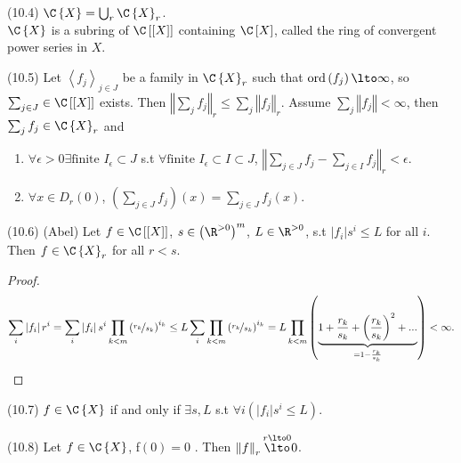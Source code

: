 \begin{defn*}
(10.4) $\C\left\{ X\right\} =\bigcup_{r}\C\left\{ X\right\} _{r}$.\\
$\C\left\{ X\right\} $ is a subring of $\C\left[\left[X\right]\right]$
containing $\C\left[X\right]$, called the ring of convergent power
series in $X$.\end{defn*}
\begin{xca*}
(10.5) Let $\left\langle f_{j}\right\rangle _{j\in J}$ be a family
in $\C\left\{ X\right\} _{r}$ such that $\mathrm{ord}\left(f_{j}\right)\lto\infty$,
so $\sum_{j\in J}\in\C\left[\left[X\right]\right]$ exists. Then $\left\Vert \sum_{j}f_{j}\right\Vert _{r}\leq\sum_{j}\left\Vert f_{j}\right\Vert _{r}$.
Assume $\sum_{j}\left\Vert f_{j}\right\Vert <\infty$, then $\sum_{j}f_{j}\in\C\left\{ X\right\} _{r}$
and\end{xca*}
\begin{enumerate}
\item $\forall\epsilon>0\exists\textrm{finite }I_{\epsilon}\subset J$ s.t
$\forall\textrm{finite }I_{\epsilon}\subset I\subset J$, $\left\Vert \sum_{j\in J}f_{j}-\sum_{j\in I}f_{j}\right\Vert _{r}<\epsilon$.
\item $\forall x\in D_{r}\left(0\right)$, $\left(\sum_{j\in J}f_{j}\right)\left(x\right)=\sum_{j\in J}f_{j}\left(x\right)$.\end{enumerate}
\begin{lem*}
(10.6) (Abel) Let $f\in\C\left[\left[X\right]\right]$, $s\in\left(\R^{>0}\right)^{m}$,
$L\in\R^{>0}$, s.t $\left|f_{i}\right|s^{i}\leq L$ for all $i$.\\
Then $f\in\C\left\{ X\right\} _{r}$ for all $r<s$.\end{lem*}
\begin{proof}
\[
\sum_{i}\left|f_{i}\right|r^{i}=\sum_{i}\left|f_{i}\right|s^{i}\prod_{k<m}\left(\nicefrac{r_{k}}{s_{k}}\right)^{i_{k}}\leq L\sum_{i}\prod_{k<m}\left(\nicefrac{r_{k}}{s_{k}}\right)^{i_{k}}=L\prod_{k<m}\left(\underbrace{1+\frac{r_{k}}{s_{k}}+\left(\frac{r_{k}}{s_{k}}\right)^{2}+...}_{=1-\frac{r_{k}}{s_{k}}}\right)<\infty.
\]
 \end{proof}
\begin{cor*}
(10.7) $f\in\C\left\{ X\right\} $ if and only if $\exists s,L$ s.t
$\forall i\left(\left|f_{i}\right|s^{i}\leq L\right)$.\end{cor*}
\begin{lem*}
(10.8) Let $f\in\C\left\{ X\right\} $, f$\left(0\right)=0$ . Then
$\left\Vert f\right\Vert _{r}\overset{r\lto0}{\lto}0$.\end{lem*}
